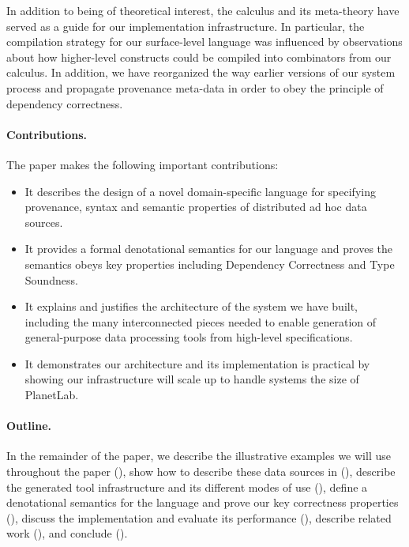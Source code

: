 In addition to being of theoretical interest, the calculus and its meta-theory
have served as a guide for our implementation infrastructure.  In particular,
the compilation strategy for our surface-level language was influenced by
observations about how higher-level constructs could be compiled into
combinators from our calculus.   In addition, we have reorganized the way 
earlier versions of our system process and propagate provenance meta-data
in order to obey the principle of dependency correctness. 

\paragraph*{Contributions.} The paper makes the following
important contributions:

\begin{itemize}
\item It describes the design of a novel 
domain-specific language for specifying provenance, syntax and
semantic properties of distributed ad hoc data
sources.  

\item It provides a formal denotational semantics for our language
and proves the semantics obeys key properties including Dependency Correctness
and Type Soundness.

\item It explains and justifies the architecture of the system we have built,
including the many interconnected pieces needed to enable  
generation of general-purpose data processing tools 
from high-level specifications.

\item It demonstrates our architecture and its implementation is practical 
by showing our infrastructure will scale up to handle systems the size of 
PlanetLab.
\end{itemize}

\paragraph{Outline.}
In the remainder of the paper, we describe the illustrative examples we will
use throughout the paper (), show how to describe
these data sources in \padsd{} (), describe
the generated tool infrastructure and its different modes of use
(), define a denotational semantics for the
language and prove our key correctness properties (), 
discuss the implementation and
evaluate its performance (), describe
related work (), and conclude
(). 

